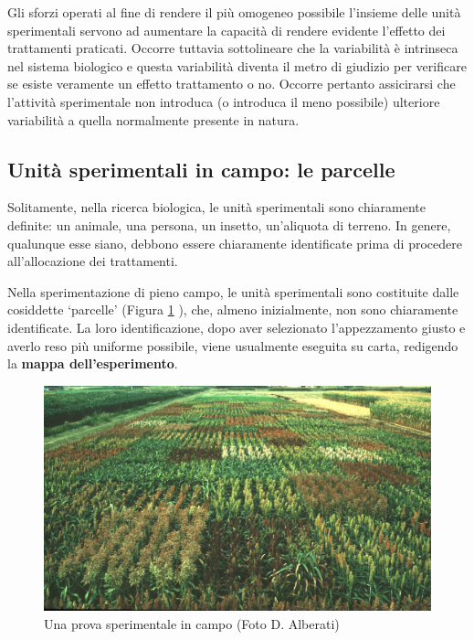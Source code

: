\documentclass[a4paper,12pt,oneside]{book}
\begin{document}
Gli sforzi operati al fine di rendere il più omogeneo possibile l'insieme delle unità sperimentali servono ad aumentare la capacità di rendere evidente l'effetto dei trattamenti praticati. Occorre tuttavia sottolineare che la variabilità è intrinseca nel sistema biologico e questa variabilità diventa il metro di giudizio per verificare se esiste veramente un effetto trattamento o no. Occorre pertanto assicirarsi che l'attività sperimentale non introduca (o introduca il meno possibile) ulteriore variabilità a quella normalmente presente in natura.

\hypertarget{unita-sperimentali-in-campo-le-parcelle}{%
\subsection{Unità sperimentali in campo: le parcelle}\label{unita-sperimentali-in-campo-le-parcelle}}

Solitamente, nella ricerca biologica, le unità sperimentali sono chiaramente definite: un animale, una persona, un insetto, un'aliquota di terreno. In genere, qualunque esse siano, debbono essere chiaramente identificate prima di procedere all'allocazione dei trattamenti.

Nella sperimentazione di pieno campo, le unità sperimentali sono costituite dalle cosiddette `parcelle' (Figura \ref{fig:figName21} ), che, almeno inizialmente, non sono chiaramente identificate. La loro identificazione, dopo aver selezionato l'appezzamento giusto e averlo reso più uniforme possibile, viene usualmente eseguita su carta, redigendo la \textbf{mappa dell'esperimento}.

\begin{figure}

{\centering \includegraphics[width=0.9\linewidth]{_images/SorgoProveVarietali} 

}

\caption{Una prova sperimentale in campo (Foto D. Alberati)}\label{fig:figName21}
\end{figure}
\end{document}
